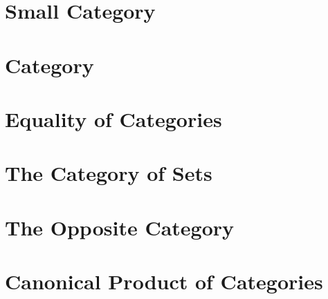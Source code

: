 \section{Small Category}
    
\section{Category}
    
\section{Equality of Categories}
    
\section{The Category of Sets}
    
\section{The Opposite Category}
    
\section{Canonical Product of Categories}
    
